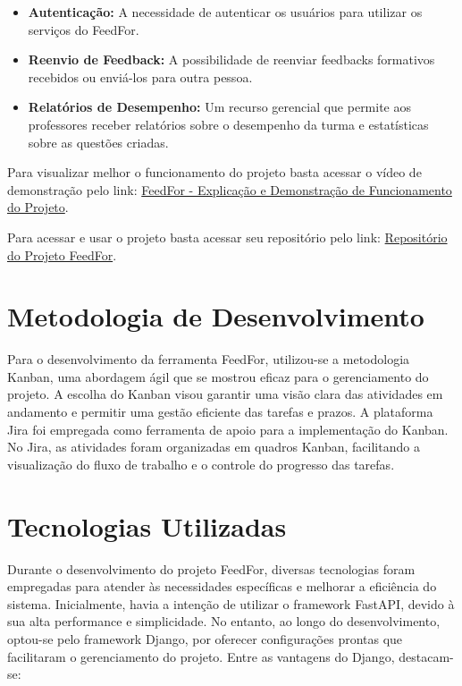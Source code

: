 \begin{itemize}
    \item \textbf{Autenticação:} A necessidade de autenticar os usuários para utilizar os serviços do FeedFor.
    \item \textbf{Reenvio de Feedback:} A possibilidade de reenviar feedbacks formativos recebidos ou enviá-los para outra pessoa.
    \item \textbf{Relatórios de Desempenho:} Um recurso gerencial que permite aos professores receber relatórios sobre o desempenho da turma e estatísticas sobre as questões criadas.
\end{itemize}

Para visualizar melhor o funcionamento do projeto basta acessar o vídeo de demonstração pelo link: \href{https://youtu.be/KL6FrNapAPk}{FeedFor - Explicação e Demonstração de Funcionamento do Projeto}.

Para acessar e usar o projeto basta acessar seu repositório pelo link: \href{https://github.com/oCaioOliveira/FeedFor}{Repositório do Projeto FeedFor}.

\section{Metodologia de Desenvolvimento}

Para o desenvolvimento da ferramenta FeedFor, utilizou-se a metodologia Kanban, uma abordagem ágil que se mostrou eficaz para o gerenciamento do projeto. A escolha do Kanban visou garantir uma visão clara das atividades em andamento e permitir uma gestão eficiente das tarefas e prazos. A plataforma Jira foi empregada como ferramenta de apoio para a implementação do Kanban. No Jira, as atividades foram organizadas em quadros Kanban, facilitando a visualização do fluxo de trabalho e o controle do progresso das tarefas.

\section{Tecnologias Utilizadas}

Durante o desenvolvimento do projeto FeedFor, diversas tecnologias foram empregadas para atender às necessidades específicas e melhorar a eficiência do sistema. Inicialmente, havia a intenção de utilizar o framework FastAPI, devido à sua alta performance e simplicidade. No entanto, ao longo do desenvolvimento, optou-se pelo framework Django, por oferecer configurações prontas que facilitaram o gerenciamento do projeto. Entre as vantagens do Django, destacam-se:

